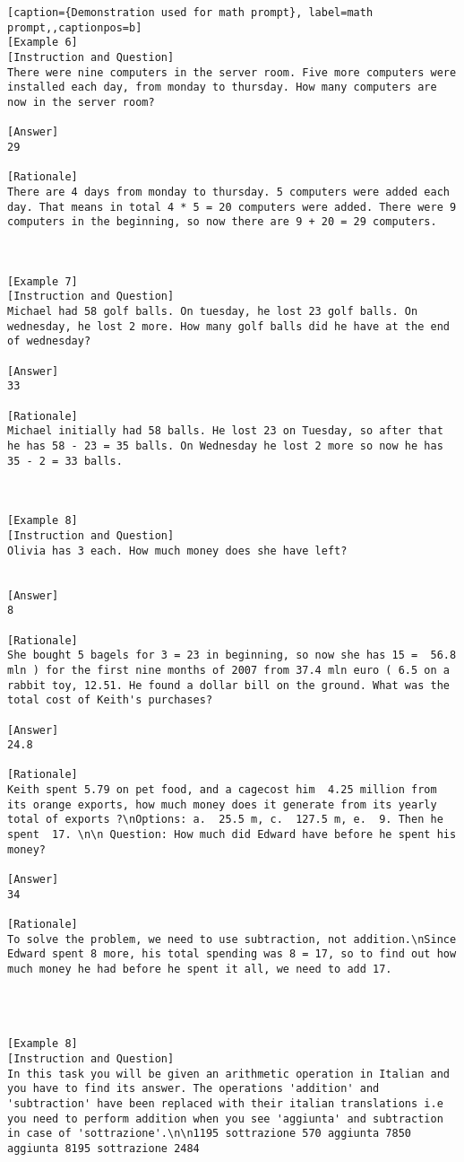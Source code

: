 \begin{lstlisting}[caption={Demonstration used for math prompt}, label=math prompt,,captionpos=b]
[Example 6]
[Instruction and Question] 
There were nine computers in the server room. Five more computers were installed each day, from monday to thursday. How many computers are now in the server room?

[Answer] 
29

[Rationale]
There are 4 days from monday to thursday. 5 computers were added each day. That means in total 4 * 5 = 20 computers were added. There were 9 computers in the beginning, so now there are 9 + 20 = 29 computers. 



[Example 7]
[Instruction and Question] 
Michael had 58 golf balls. On tuesday, he lost 23 golf balls. On wednesday, he lost 2 more. How many golf balls did he have at the end of wednesday?

[Answer] 
33

[Rationale]
Michael initially had 58 balls. He lost 23 on Tuesday, so after that he has 58 - 23 = 35 balls. On Wednesday he lost 2 more so now he has 35 - 2 = 33 balls. 



[Example 8]
[Instruction and Question] 
Olivia has 3 each. How much money does she have left?


[Answer] 
8

[Rationale]
She bought 5 bagels for 3 = 23 in beginning, so now she has 15 =  56.8 mln ) for the first nine months of 2007 from 37.4 mln euro ( 6.5 on a rabbit toy, 12.51. He found a dollar bill on the ground. What was the total cost of Keith's purchases?

[Answer]
24.8

[Rationale]
Keith spent 5.79 on pet food, and a cagecost him  4.25 million from its orange exports, how much money does it generate from its yearly total of exports ?\nOptions: a.  25.5 m, c.  127.5 m, e.  9. Then he spent  17. \n\n Question: How much did Edward have before he spent his money?

[Answer]
34

[Rationale]
To solve the problem, we need to use subtraction, not addition.\nSince Edward spent 8 more, his total spending was 8 = 17, so to find out how much money he had before he spent it all, we need to add 17.




[Example 8]
[Instruction and Question]
In this task you will be given an arithmetic operation in Italian and you have to find its answer. The operations 'addition' and 'subtraction' have been replaced with their italian translations i.e you need to perform addition when you see 'aggiunta' and subtraction in case of 'sottrazione'.\n\n1195 sottrazione 570 aggiunta 7850 aggiunta 8195 sottrazione 2484


\end{lstlisting}
